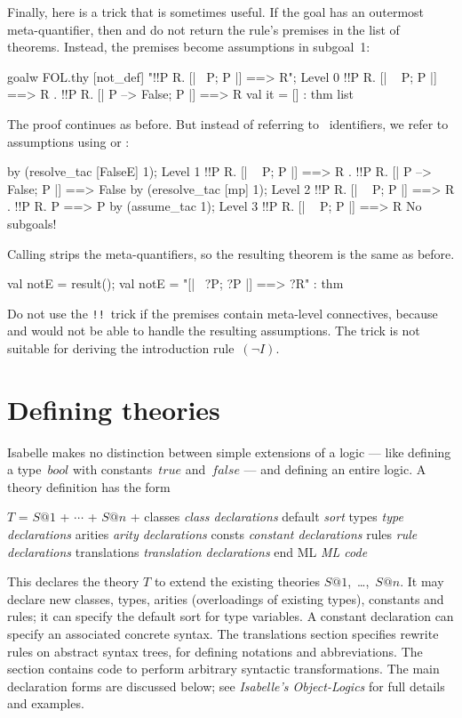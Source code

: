 \medskip Finally, here is a trick that is sometimes useful.  If the goal
has an outermost meta-quantifier, then  and 
do not return the rule's premises in the list of theorems.  Instead, the
premises become assumptions in subgoal~1:
\begin{ttbox}
goalw FOL.thy [not_def] "!!P R. [| ~P;  P |] ==> R";
{\out Level 0}
{\out !!P R. [| ~ P; P |] ==> R}
{. !!P R. [| P --> False; P |] ==> R}
val it = [] : thm list
\end{ttbox}
The proof continues as before.  But instead of referring to \ML\
identifiers, we refer to assumptions using  or
\ttindex{assume_tac}: 
\begin{ttbox}
by (resolve_tac [FalseE] 1);
{\out Level 1}
{\out !!P R. [| ~ P; P |] ==> R}
{. !!P R. [| P --> False; P |] ==> False}
\ttbreak
by (eresolve_tac [mp] 1);
{\out Level 2}
{\out !!P R. [| ~ P; P |] ==> R}
{. !!P R. P ==> P}
\ttbreak
by (assume_tac 1);
{\out Level 3}
{\out !!P R. [| ~ P; P |] ==> R}
{\out No subgoals!}
\end{ttbox}
Calling  strips the meta-quantifiers, so the resulting
theorem is the same as before.
\begin{ttbox}
val notE = result();
{\out val notE = "[| ~?P; ?P |] ==> ?R" : thm}
\end{ttbox}
Do not use the {\tt!!}\ trick if the premises contain meta-level
connectives, because \ttindex{eresolve_tac} and  would
not be able to handle the resulting assumptions.  The trick is not suitable
for deriving the introduction rule~$(\neg I)$.


\section{Defining theories}
Isabelle makes no distinction between simple extensions of a logic --- like
defining a type~$bool$ with constants~$true$ and~$false$ --- and defining
an entire logic.  A theory definition has the form
\begin{ttbox}
\(T\) = \(S@1\) + \(\cdots\) + \(S@n\) +
classes      {\it class declarations}
default      {\it sort}
types        {\it type declarations}
arities      {\it arity declarations}
consts       {\it constant declarations}
rules        {\it rule declarations}
translations {\it translation declarations}
end
ML           {\it ML code}
\end{ttbox}
This declares the theory $T$ to extend the existing theories
$S@1$,~\ldots,~$S@n$.  It may declare new classes, types, arities
(overloadings of existing types), constants and rules; it can specify the
default sort for type variables.  A constant declaration can specify an
associated concrete syntax.  The translations section specifies rewrite
rules on abstract syntax trees, for defining notations and abbreviations.
The {\ML} section contains code to perform arbitrary syntactic
transformations.  The main declaration forms are discussed below; see {\em
  Isabelle's Object-Logics} for full details and examples.

